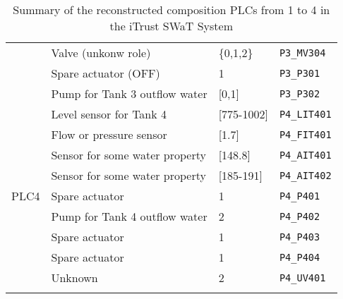 {\begin{longtable}[c]{p{} p{} p{} p{}}
		& Valve (unkonw role) & \{0,1,2\} & \texttt{P3\_MV304} \\
		& Spare actuator (OFF) & 1 & \texttt{P3\_P301} \\
		& Pump for Tank 3 outflow water & [0,1] & \texttt{P3\_P302} \\
		\hline
		\multirow{9}{12em}{PLC4} & Level sensor for Tank 4 & [775-1002] & \texttt{P4\_LIT401} \\
		& Flow or pressure sensor & [1.7] & \texttt{P4\_FIT401} \\
		& Sensor for some water property & [148.8] & \texttt{P4\_AIT401} \\
		& Sensor for some water property & [185-191] & \texttt{P4\_AIT402} \\
		& Spare actuator & 1 & \texttt{P4\_P401} \\
		& Pump for Tank 4 outflow water & 2 & \texttt{P4\_P402} \\
		& Spare actuator & 1 & \texttt{P4\_P403} \\
		& Spare actuator & 1 & \texttt{P4\_P404} \\
		& Unknown & 2 & \texttt{P4\_UV401} \\
		\hline
		
		\caption{Summary of the reconstructed composition PLCs from 1 to 4 in the iTrust SWaT System}
		\label{table:6_plc_registers_summary}
	\end{longtable}
}
\vfill
